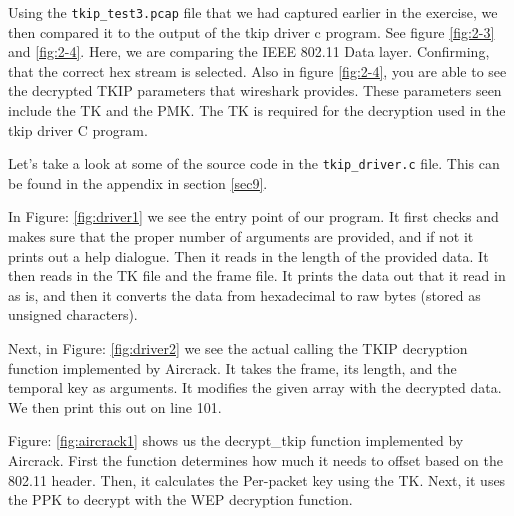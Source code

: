 \documentclass[main.tex]{subfiles}
\begin{document}


Using the \texttt{tkip\_test3.pcap} file that we had captured earlier in the exercise, we then compared it to the output of the tkip driver c program. See figure \ref{fig:2-3} and \ref{fig:2-4}. Here, we are comparing the IEEE 802.11 Data layer. Confirming, that the correct hex stream is selected. Also in figure \ref{fig:2-4}, you are able to see the decrypted TKIP parameters that wireshark provides. These parameters seen include the TK and the PMK. The TK is required for the decryption used in the tkip driver C program. 




Let's take a look at some of the source code in the \texttt{tkip\_driver.c} file. This can be found in the appendix in section \ref{sec9}.


In Figure: \ref{fig:driver1} we see the entry point of our program. It first checks and makes sure that the proper number of arguments are provided, and if not it prints out a help dialogue. Then it reads in the length of the provided data. It then reads in the TK file and the frame file. It prints the data out that it read in as is, and then it converts the data from hexadecimal to raw bytes (stored as unsigned characters).


Next, in Figure: \ref{fig:driver2} we see the actual calling the TKIP decryption function implemented by Aircrack. It takes the frame, its length, and the temporal key as arguments. It modifies the given array with the decrypted data. We then print this out on line 101.


Figure: \ref{fig:aircrack1} shows us the decrypt\_tkip function implemented by Aircrack. First the function determines how much it needs to offset based on the 802.11 header. Then, it calculates the Per-packet key using the TK. Next, it uses the PPK to decrypt with the WEP decryption function.

\end{document}
